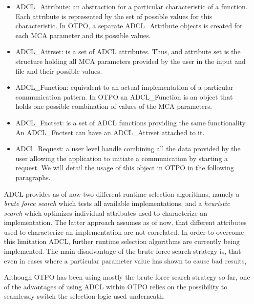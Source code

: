 \begin{itemize}
\item ADCL\_Attribute\cite{ADCL-spec}: an abstraction for a particular
  characteristic of a function. Each attribute is represented by the set of 
  possible values for this characteristic. In OTPO, a separate ADCL\_Attribute
  objects is created for each MCA parameter and its possible  values.
\item ADCL\_Attrset\cite{ADCL-spec}: is a set of ADCL attributes. Thus, and 
  attribute set is the structure holding all MCA parameters provided by the user in the input
  and file and their possible values.
\item ADCL\_Function\cite{ADCL-spec}: equivalent to an actual implementation
  of a particular communication pattern. In OTPO an ADCL\_Function is an
  object that holds one possible combination of values of the MCA
  parameters.
\item ADCL\_Fnctset\cite{ADCL-spec}: is a set of ADCL functions providing the same
	functionality. An ADCL\_Fnctset can have an ADCL\_Attrset attached to it. 
\item ADCl\_Request\cite{ADCL-spec}: a user level handle combining all the data 
  provided by the user allowing the application to initiate a communication
  by starting a request. We will detail the usage of this object in OTPO  
  in the following paragraphs. 
\end{itemize}

ADCL provides as of now two different runtime selection algorithms, namely a {\it brute force search} which tests all available implementations, and a {\it heuristic search} which optimizes individual attributes used to characterize an implementation. The latter approach assumes as of now, that different attributes used to characterize an implementation are not correlated. In order to overcome this limitation ADCL, further runtime selection algorithms are currently being implemented. The main disadvantage of the brute force search strategy is, that even in cases where a particular parameter value has shown to cause bad results, 

Although OTPO has been using mostly the brute force search strategy so far, one of the advantages of using ADCL within OTPO relies on the possibility to seamlessly switch the selection logic used underneath.



